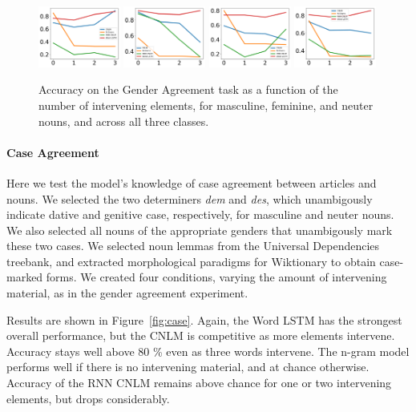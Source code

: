 \begin{figure}
\includegraphics[width=0.24\textwidth]{figures/german-gender-m.pdf}
\includegraphics[width=0.24\textwidth]{figures/german-gender-f.pdf}
\includegraphics[width=0.24\textwidth]{figures/german-gender-n.pdf}
\includegraphics[width=0.24\textwidth]{figures/german-gender-total.pdf}
\caption{Accuracy on the Gender Agreement task as a function of the number of intervening elements, for masculine, feminine, and neuter nouns, and across all three classes.}\label{fig:gender}
\end{figure}


\paragraph{Case Agreement}
Here we test the model's knowledge of case agreement between articles and nouns.
We selected the two determiners \emph{dem} and \emph{des}, which unambigously indicate dative and genitive case, respectively, for masculine and neuter nouns.
We also selected all nouns of the appropriate genders that unambigously mark these two cases.
We selected noun lemmas from the Universal Dependencies treebank, and extracted morphological paradigms for Wiktionary to obtain case-marked forms.
We created four conditions, varying the amount of intervening material, as in the gender agreement experiment.

Results are shown in Figure~\ref{fig:case}.
Again, the Word LSTM has the strongest overall performance, but the CNLM is competitive as more elements intervene. Accuracy stays well above 80 \% even as three words intervene.
The n-gram model performs well if there is no intervening material, and at chance otherwise.
Accuracy of the RNN CNLM remains above chance for one or two intervening elements, but drops considerably.

